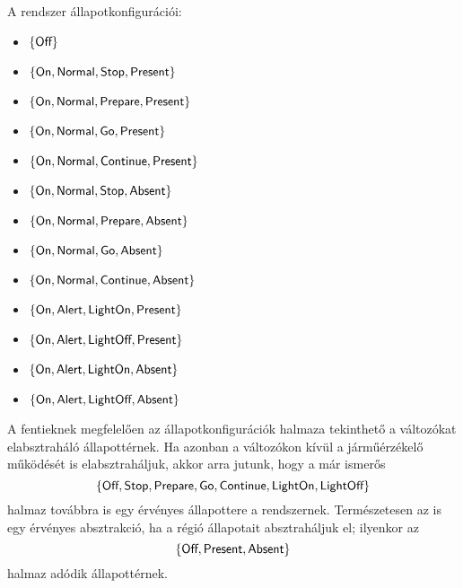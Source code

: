 \begin{pelda}
A rendszer állapotkonfigurációi:

\begin{itemize}
\item $\{ \textsf{Off} \}$
\item $\{ \textsf{On}, \textsf{Normal}, \textsf{Stop}, \textsf{Present} \}$
\item $\{ \textsf{On}, \textsf{Normal}, \textsf{Prepare}, \textsf{Present} \}$
\item $\{ \textsf{On}, \textsf{Normal}, \textsf{Go}, \textsf{Present} \}$
\item $\{ \textsf{On}, \textsf{Normal}, \textsf{Continue}, \textsf{Present} \}$
\item $\{ \textsf{On}, \textsf{Normal}, \textsf{Stop}, \textsf{Absent} \}$
\item $\{ \textsf{On}, \textsf{Normal}, \textsf{Prepare}, \textsf{Absent} \}$
\item $\{ \textsf{On}, \textsf{Normal}, \textsf{Go}, \textsf{Absent} \}$
\item $\{ \textsf{On}, \textsf{Normal}, \textsf{Continue}, \textsf{Absent} \}$
\item $\{ \textsf{On}, \textsf{Alert}, \textsf{LightOn}, \textsf{Present} \}$
\item $\{ \textsf{On}, \textsf{Alert}, \textsf{LightOff}, \textsf{Present} \}$
\item $\{ \textsf{On}, \textsf{Alert}, \textsf{LightOn}, \textsf{Absent} \}$
\item $\{ \textsf{On}, \textsf{Alert}, \textsf{LightOff}, \textsf{Absent} \}$
\end{itemize}
\end{pelda}

\begin{pelda}
A fentieknek megfelelően az állapotkonfigurációk halmaza tekinthető a változókat elabsztraháló állapottérnek. Ha azonban a változókon kívül a járműérzékelő működését is elabsztraháljuk, akkor arra jutunk, hogy a már ismerős
$$\{ \textsf{Off}, \textsf{Stop}, \textsf{Prepare}, \textsf{Go}, \textsf{Continue}, \textsf{LightOn}, \textsf{LightOff} \}$$
halmaz továbbra is egy érvényes állapottere a rendszernek. Természetesen az is egy érvényes absztrakció, ha a  régió állapotait absztraháljuk el; ilyenkor az
$$\{ \textsf{Off}, \textsf{Present}, \textsf{Absent} \}$$
halmaz adódik állapottérnek.
\end{pelda}

